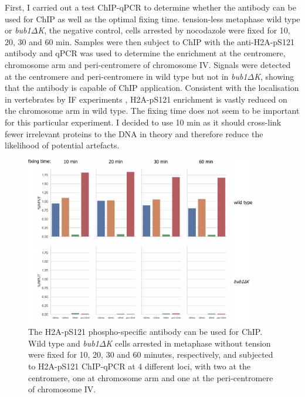 First, I carried out a test ChIP-qPCR to determine whether the antibody can be used for ChIP as well as the optimal fixing time. tension-less metaphase wild type or \textit{bub1$\Delta$K}, the negative control, cells arrested by nocodazole were fixed for 10, 20, 30 and 60 \si{\minute}. Samples were then subject to ChIP with the anti-H2A-pS121 antibody and qPCR was used to determine the enrichment at the centromere, chromosome arm and peri-centromere of chromosome IV. Signals were detected at the centromere and peri-centromere in wild type but not in \textit{bub1$\Delta$K}, showing that the antibody is capable of ChIP application. Consistent with the localisation in vertebrates by IF experiments \citep{Ricke2012, Kawashima2010a, Liu2013a, Williams2017Bub1Kinetochores, Zhang2020FunctioningMitosis, Liang2019ACells, Lee2008, Liu2015}, H2A-pS121 enrichment is vastly reduced on the chromosome arm in wild type. The fixing time does not seem to be important for this particular experiment. I decided to use 10 \si{\minute} as it should cross-link fewer irrelevant proteins to the DNA in theory and therefore reduce the likelihood of potential artefacts. 

\begin{figure}[htbp]
  \centering
  \includegraphics[width=0.9\textwidth]{chapter3/figures/pH2A test ChIP-qPCR.pdf}
  \caption[The H2A-pS121 phospho-specific antibody can be used for ChIP]{The H2A-pS121 phospho-specific antibody can be used for ChIP. Wild type and \textit{bub1$\Delta$K} cells arrested in metaphase without tension were fixed for 10, 20, 30 and 60 minutes, respectively, and subjected to H2A-pS121 ChIP-qPCR at 4 different loci, with two at the centromere, one at chromosome arm and one at the peri-centromere of chromosome IV. }
  \label{fig:ph2atestchipqpcr}
\end{figure}

